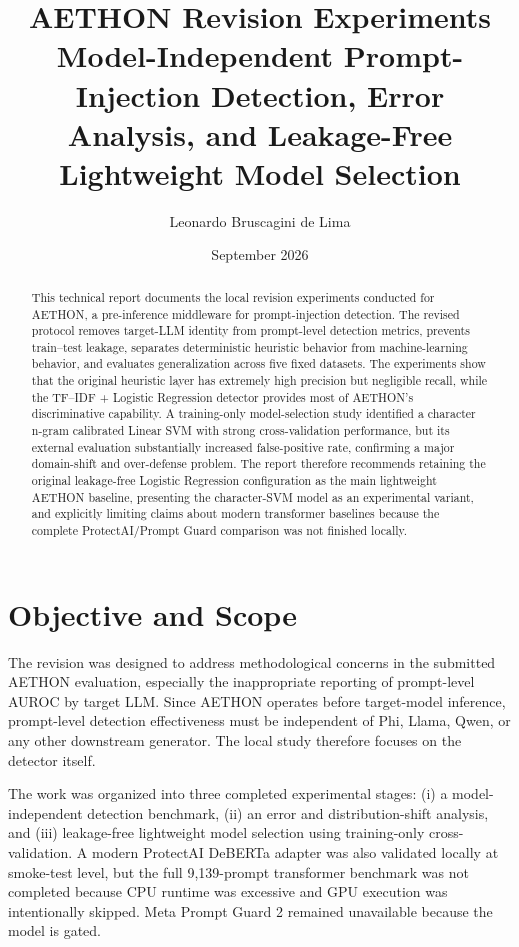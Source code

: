 \documentclass[11pt,a4paper]{article}
\title{AETHON Revision Experiments\\
\large Model-Independent Prompt-Injection Detection, Error Analysis, and Leakage-Free Lightweight Model Selection}
\author{Leonardo Bruscagini de Lima}
\date{September 2026}
\begin{document}
\maketitle

\begin{abstract}
This technical report documents the local revision experiments conducted for AETHON, a pre-inference middleware for prompt-injection detection. The revised protocol removes target-LLM identity from prompt-level detection metrics, prevents train--test leakage, separates deterministic heuristic behavior from machine-learning behavior, and evaluates generalization across five fixed datasets. The experiments show that the original heuristic layer has extremely high precision but negligible recall, while the TF--IDF + Logistic Regression detector provides most of AETHON's discriminative capability. A training-only model-selection study identified a character n-gram calibrated Linear SVM with strong cross-validation performance, but its external evaluation substantially increased false-positive rate, confirming a major domain-shift and over-defense problem. The report therefore recommends retaining the original leakage-free Logistic Regression configuration as the main lightweight AETHON baseline, presenting the character-SVM model as an experimental variant, and explicitly limiting claims about modern transformer baselines because the complete ProtectAI/Prompt Guard comparison was not finished locally.
\end{abstract}

\section{Objective and Scope}
The revision was designed to address methodological concerns in the submitted AETHON evaluation, especially the inappropriate reporting of prompt-level AUROC by target LLM. Since AETHON operates before target-model inference, prompt-level detection effectiveness must be independent of Phi, Llama, Qwen, or any other downstream generator. The local study therefore focuses on the detector itself.

The work was organized into three completed experimental stages: (i) a model-independent detection benchmark, (ii) an error and distribution-shift analysis, and (iii) leakage-free lightweight model selection using training-only cross-validation. A modern ProtectAI DeBERTa adapter was also validated locally at smoke-test level, but the full 9,139-prompt transformer benchmark was not completed because CPU runtime was excessive and GPU execution was intentionally skipped. Meta Prompt Guard 2 remained unavailable because the model is gated.
\end{document}
